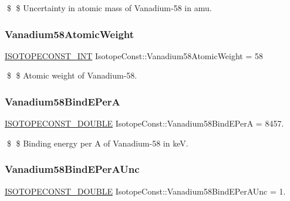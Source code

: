 \$ \$ Uncertainty in atomic mass of Vanadium-\/58 in amu. \mbox{\label{group___isotope_const-_vanadium-_v58_gac67c6039e7a7aa24cbeda8ad0d1bf058}} 
\subsubsection{\texorpdfstring{Vanadium58\+Atomic\+Weight}{Vanadium58AtomicWeight}}
{\footnotesize\ttfamily \mbox{\hyperlink{group___isotope_const-_macros_ga5f18360b3e99483a35c32d789e62621c}{I\+S\+O\+T\+O\+P\+E\+C\+O\+N\+S\+T\+\_\+\+I\+NT}} Isotope\+Const\+::\+Vanadium58\+Atomic\+Weight = 58}

\$ \$ Atomic weight of Vanadium-\/58. \mbox{\label{group___isotope_const-_vanadium-_v58_ga715642eb1f72cade7f346482cab0ed28}} 
\subsubsection{\texorpdfstring{Vanadium58\+Bind\+E\+PerA}{Vanadium58BindEPerA}}
{\footnotesize\ttfamily \mbox{\hyperlink{group___isotope_const-_macros_ga8f45a7272ce02c0b4c65c44636ed719a}{I\+S\+O\+T\+O\+P\+E\+C\+O\+N\+S\+T\+\_\+\+D\+O\+U\+B\+LE}} Isotope\+Const\+::\+Vanadium58\+Bind\+E\+PerA = 8457.}

\$ \$ Binding energy per A of Vanadium-\/58 in keV. \mbox{\label{group___isotope_const-_vanadium-_v58_ga47b760d5a61f16d059ba35b6cbb79a10}} 
\subsubsection{\texorpdfstring{Vanadium58\+Bind\+E\+Per\+A\+Unc}{Vanadium58BindEPerAUnc}}
{\footnotesize\ttfamily \mbox{\hyperlink{group___isotope_const-_macros_ga8f45a7272ce02c0b4c65c44636ed719a}{I\+S\+O\+T\+O\+P\+E\+C\+O\+N\+S\+T\+\_\+\+D\+O\+U\+B\+LE}} Isotope\+Const\+::\+Vanadium58\+Bind\+E\+Per\+A\+Unc = 1.}

